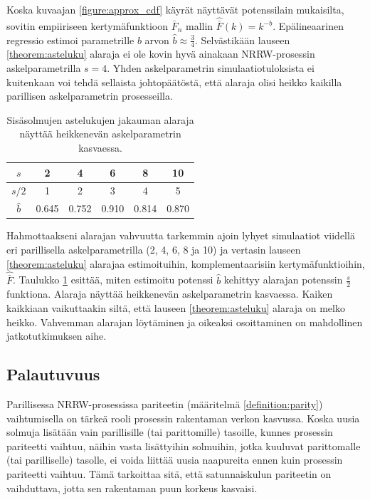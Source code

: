 \documentclass[finnish, 12pt, a4paper, sci, utf8, pdfa]{aaltothesis}
\begin{document}
Koska kuvaajan \ref{figure:approx_cdf} käyrät näyttävät potenssilain mukaisilta, sovitin empiiriseen kertymäfunktioon $ \bar{F}_{n} $ mallin $ \hat{\bar{F}}(k) = k^{-b} $. Epälineaarinen
regressio estimoi parametrille $ b $ arvon $ \hat{b} \approx \frac{3}{4} $. Selvästikään lauseen \ref{theorem:asteluku} alaraja ei ole kovin hyvä ainakaan NRRW-prosessin askelparametrilla 
$ s = 4 $. Yhden askelparametrin simulaatiotuloksista ei kuitenkaan voi tehdä sellaista johtopäätöstä, että alaraja olisi heikko kaikilla parillisen askelparametrin prosesseilla.

\begin{table}[htb]
   \begin{center}
   \renewcommand{\arraystretch}{1.2}
   \begin{tabular}{|c|c|c|c|c|c|}
   \hline
   $ s           $ & 2     & 4     & 6     & 8     & 10 \\ \hline
   $ s / 2       $ & 1     & 2     & 3     & 4     & 5 \\ \hline
   $ \hat{b}     $ & 0.645 & 0.752 & 0.910 & 0.814 & 0.870 \\ \hline
   \end{tabular}
   \end{center}
   \label{table:bound-test}
   \caption{Sisäsolmujen astelukujen jakauman alaraja näyttää heikkenevän askelparametrin kasvaessa.}
\end{table}
Hahmottaakseni alarajan vahvuutta tarkemmin ajoin lyhyet simulaatiot viidellä eri parillisella askelparametrilla (2, 4, 6, 8 ja 10) ja vertasin lauseen \ref{theorem:asteluku} 
alarajaa estimoituihin, komplementaarisiin kertymäfunktioihin, $\hat{\bar{F}}$. Taulukko \ref{table:bound-test} esittää, miten estimoitu potenssi $ \hat{b} $ kehittyy alarajan 
potenssin $ \frac{s}{2} $ funktiona. Alaraja näyttää heikkenevän askelparametrin kasvaessa. Kaiken kaikkiaan vaikuttaakin siltä, että lauseen \ref{theorem:asteluku} alaraja 
on melko heikko. Vahvemman alarajan löytäminen ja oikeaksi osoittaminen on mahdollinen jatkotutkimuksen aihe.

\subsection{Palautuvuus}

Parillisessa NRRW-prosessissa pariteetin (määritelmä \ref{definition:parity}) vaihtumisella on tärkeä rooli prosessin rakentaman verkon kasvussa. Koska uusia solmuja lisätään
vain parillisille (tai parittomille) tasoille, kunnes prosessin pariteetti vaihtuu, näihin vasta lisättyihin solmuihin, jotka kuuluvat parittomalle (tai parilliselle) tasolle,
ei voida liittää uusia naapureita ennen kuin prosessin pariteetti vaihtuu. Tämä tarkoittaa sitä, että satunnaiskulun pariteetin on vaihduttava, jotta sen rakentaman puun korkeus kasvaisi. 
\end{document}
